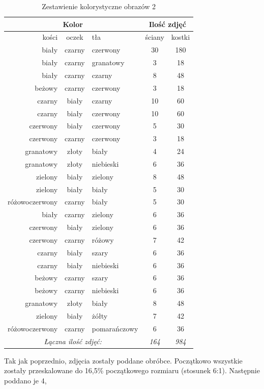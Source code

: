 \begin{table}[h!]
\centering
\begin{tabular}{rcl|cc}
\multicolumn{3}{c}{Kolor} & \multicolumn{2}{c}{Ilość zdjęć} \\ \hline
kości & oczek & tła & ściany & kostki \\ \hline
biały & czarny & czerwony & 30 & 180 \\
biały & czarny & granatowy & 3 & 18 \\
biały & czarny & czarny & 8 & 48 \\
beżowy & czarny & czerwony & 3 & 18 \\
czarny & biały & czarny & 10 & 60 \\
czarny & biały & czerwony & 10 & 60 \\
czerwony & biały & czerwony & 5 & 30 \\
czerwony & czarny & czerwony & 3 & 18 \\
granatowy & złoty & biały & 4 & 24 \\
granatowy & złoty & niebieski & 6 & 36 \\
zielony & biały & zielony & 8 & 48 \\
zielony & biały & biały & 5 & 30 \\
różowoczerwony & czarny & biały & 5 & 30 \\ \hline
biały & czarny & zielony & 6 & 36 \\
czerwony & biały & zielony & 6 & 36 \\
czerwony & czarny & różowy & 7 & 42 \\
czarny & biały & szary & 6 & 36 \\
czarny & biały & niebieski & 6 & 36 \\
beżowy & czarny & szary & 6 & 36 \\
beżowy & czarny & niebieski & 6 & 36 \\
granatowy & złoty & biały & 8 & 48 \\
zielony & biały & żółty & 7 & 42 \\
różowoczerwony & czarny & pomarańczowy & 6 & 36 \\ \hline
\multicolumn{3}{c}{\textit{Łączna ilość zdjęć:}} & \textit{164} & \textit{984}
\end{tabular}
\vspace{0.2cm}
\caption{Zestawienie kolorystyczne obrazów 2}
\label{tab:zestawienie2}
\end{table}
Tak jak poprzednio, zdjęcia zostały poddane obróbce. Początkowo wszystkie zostały
przeskalowane do 16,5\% początkowego rozmiaru (stosunek 6:1). Następnie poddano je 4,
